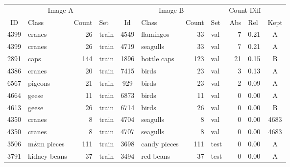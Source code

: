 \begin{tabular}{clrlclrlrlc}
 \toprule
\multicolumn{4}{c}{Image A} & \multicolumn{4}{c}{Image B} & \multicolumn{2}{c}{Count Diff} \\
ID & Class & Count & Set & Id & Class & Count & Set & Abs & Rel & Kept\\
\cmidrule(r){1-4} \cmidrule(r){5-8} \cmidrule(r){9-10} \cmidrule(r){11-11}

4399 & cranes & 26 & train & 4549 & flamingos & 33 & val & 7 & 0.21 & A\\
4399 & cranes & 26 & train & 4719 & seagulls & 33 & val & 7 & 0.21 & A \\
2891 & caps & 144 & train & 1896 & bottle caps & 123 & val & 21 & 0.15 & B \\
4386 & cranes & 20 & train & 7415 & birds & 23 & val & 3 & 0.13 & A\\
6567 & pigeons & 21 & train & 929 & birds & 23 & val & 2 & 0.09 & A\\
4664 & geese & 11 & train & 6873 & birds & 11 & val & 0 & 0.00 & A\\
4613 & geese & 26 & train & 6714 & birds & 26 & val & 0 & 0.00 & B\\
4350 & cranes & 8 & train & 4704 & seagulls & 8 & val & 0 & 0.00 & 4683 \\
4350 & cranes & 8 & train & 4707 & seagulls & 8 & val & 0 & 0.00 & 4683\\
3506 & m\&m pieces & 111 & train & 3698 & candy pieces & 111 & test & 0 & 0.00 & A\\
3791 & kidney beans & 37 & train & 3494 & red beans & 37 & test & 0 & 0.00 & A\\

\bottomrule
\end{tabular}